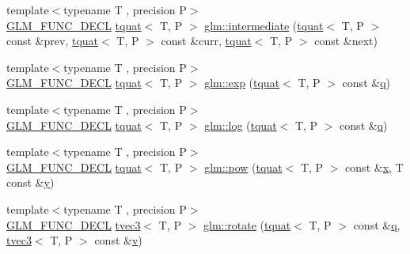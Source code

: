 \begin{DoxyCompactItemize}
\item 
{\footnotesize template$<$typename T , precision P$>$ }\\\mbox{\hyperlink{setup_8hpp_ab2d052de21a70539923e9bcbf6e83a51}{G\+L\+M\+\_\+\+F\+U\+N\+C\+\_\+\+D\+E\+CL}} \mbox{\hyperlink{structglm_1_1tquat}{tquat}}$<$ T, P $>$ \mbox{\hyperlink{group__gtx__quaternion_ga56abae85b3669c866e91f3c57b298b9c}{glm\+::intermediate}} (\mbox{\hyperlink{structglm_1_1tquat}{tquat}}$<$ T, P $>$ const \&prev, \mbox{\hyperlink{structglm_1_1tquat}{tquat}}$<$ T, P $>$ const \&curr, \mbox{\hyperlink{structglm_1_1tquat}{tquat}}$<$ T, P $>$ const \&next)
\item 
{\footnotesize template$<$typename T , precision P$>$ }\\\mbox{\hyperlink{setup_8hpp_ab2d052de21a70539923e9bcbf6e83a51}{G\+L\+M\+\_\+\+F\+U\+N\+C\+\_\+\+D\+E\+CL}} \mbox{\hyperlink{structglm_1_1tquat}{tquat}}$<$ T, P $>$ \mbox{\hyperlink{group__gtx__quaternion_ga17295173d4c2b5ae49b84e9993b63a62}{glm\+::exp}} (\mbox{\hyperlink{structglm_1_1tquat}{tquat}}$<$ T, P $>$ const \&\mbox{\hyperlink{glad_8h_a514729309336df22bcc8eda979d6ced4}{q}})
\item 
{\footnotesize template$<$typename T , precision P$>$ }\\\mbox{\hyperlink{setup_8hpp_ab2d052de21a70539923e9bcbf6e83a51}{G\+L\+M\+\_\+\+F\+U\+N\+C\+\_\+\+D\+E\+CL}} \mbox{\hyperlink{structglm_1_1tquat}{tquat}}$<$ T, P $>$ \mbox{\hyperlink{group__gtx__quaternion_ga791f42e134bfe97fc9c96f4668dd7489}{glm\+::log}} (\mbox{\hyperlink{structglm_1_1tquat}{tquat}}$<$ T, P $>$ const \&\mbox{\hyperlink{glad_8h_a514729309336df22bcc8eda979d6ced4}{q}})
\item 
{\footnotesize template$<$typename T , precision P$>$ }\\\mbox{\hyperlink{setup_8hpp_ab2d052de21a70539923e9bcbf6e83a51}{G\+L\+M\+\_\+\+F\+U\+N\+C\+\_\+\+D\+E\+CL}} \mbox{\hyperlink{structglm_1_1tquat}{tquat}}$<$ T, P $>$ \mbox{\hyperlink{group__gtx__quaternion_ga42a0cf206c59eaeff4c67dd62e09a580}{glm\+::pow}} (\mbox{\hyperlink{structglm_1_1tquat}{tquat}}$<$ T, P $>$ const \&\mbox{\hyperlink{glad_8h_a92d0386e5c19fb81ea88c9f99644ab1d}{x}}, T const \&\mbox{\hyperlink{glad_8h_a66ddd433d2cacfe27f5906b7e86faeed}{y}})
\item 
{\footnotesize template$<$typename T , precision P$>$ }\\\mbox{\hyperlink{setup_8hpp_ab2d052de21a70539923e9bcbf6e83a51}{G\+L\+M\+\_\+\+F\+U\+N\+C\+\_\+\+D\+E\+CL}} \mbox{\hyperlink{structglm_1_1tvec3}{tvec3}}$<$ T, P $>$ \mbox{\hyperlink{group__gtx__quaternion_ga9f39f0d3ecd66839a4af44560aa10fb2}{glm\+::rotate}} (\mbox{\hyperlink{structglm_1_1tquat}{tquat}}$<$ T, P $>$ const \&\mbox{\hyperlink{glad_8h_a514729309336df22bcc8eda979d6ced4}{q}}, \mbox{\hyperlink{structglm_1_1tvec3}{tvec3}}$<$ T, P $>$ const \&\mbox{\hyperlink{glad_8h_a14cfbe2fc2234f5504618905b69d1e06}{v}})

\end{DoxyCompactItemize}

